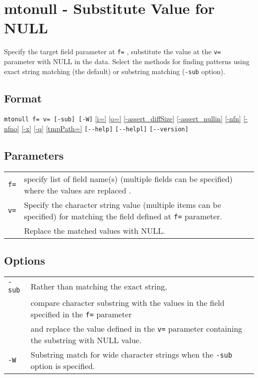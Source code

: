 
%

\section{mtonull - Substitute Value for NULL\label{sect:mtonull}}
Specify the target field parameter at \verb|f=| , substitute the value at the \verb|v=| parameter with NULL in the data. Select the methods for finding patterns using exact string matching (the default) or substring matching (\verb|-sub| option). 


\subsection*{Format}
\verb|mtonull f= v= [-sub] [-W]|
\hyperref[sect:option_i]{[i=]}
\hyperref[sect:option_o]{[o=]}
\hyperref[sect:option_assert_diffSize]{[-assert\_diffSize]}
\hyperref[sect:option_assert_nullin]{[-assert\_nullin]}
\hyperref[sect:option_nfn]{[-nfn]} 
\hyperref[sect:option_nfno]{[-nfno]}  
\hyperref[sect:option_x]{[-x]}
\hyperref[sect:option_q]{[-q]}
\hyperref[sect:option_option_tmppath]{[tmpPath=]}
\verb|[--help]|
\verb|[--helpl]|
\verb|[--version]|\\

\subsection*{Parameters}
\begin{table}[htbp]
{\small
\begin{tabular}{ll}
\verb|f=|  & specify list of field name(s) (multiple fields can be specified) where the values are replaced .\\
\verb|v=|  & Specify the character string value (multiple items can be specified) for matching the field defined at \verb|f=| parameter. \\
           & Replace the matched values with NULL.\\
\end{tabular} 
}
\end{table} 

\subsection*{Options}
\begin{table}[htbp]
{\small
\begin{tabular}{ll}
\verb|-sub|    & Rather than matching the exact string, \\
		& compare character substring with the values in the field specified in the \verb|f=| parameter \\
		& and replace the value defined in the \verb|v=| parameter containing the substring with NULL value.\\
\verb|-W|      & Substring match for wide character strings when the \verb|-sub| option is specified. \\
\end{tabular} 
}
\end{table} 

